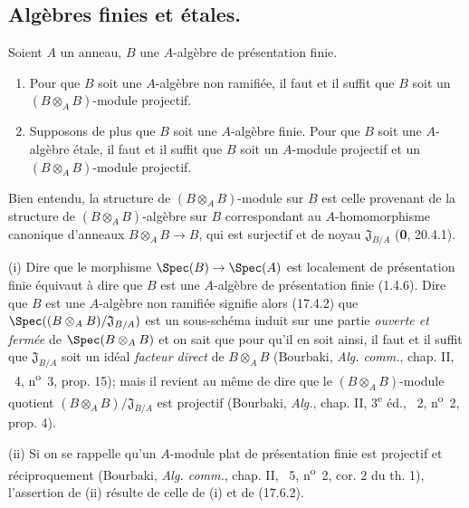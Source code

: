 \subsection{Algèbres finies et étales.}

\begin{proposition}[18.3.1]
\label{IV.18.3.1}
Soient $A$ un anneau, $B$ une $A$-algèbre de présentation finie.
\begin{enumerate}
  \item[\textup{(i)}] Pour que $B$ soit une $A$-algèbre non ramifiée, il faut et il suffit que $B$ soit un $(B\otimes_A B)$-module projectif.
  \item[\textup{(ii)}] Supposons de plus que $B$ soit une $A$-algèbre finie. Pour que $B$ soit une $A$-algèbre étale, il faut et il suffit que $B$ soit un $A$-module projectif et un $(B\otimes_A B)$-module projectif.
\end{enumerate}
\end{proposition}

Bien entendu, la structure de $(B\otimes_A B)$-module sur $B$ est celle provenant de la structure de $(B\otimes_A B)$-algèbre sur $B$ correspondant au $A$-homomorphisme canonique d'anneaux $B\otimes_A B\to B$, qui est surjectif et de noyau $\mathfrak J_{B/A}$ (\textbf{0}, 20.4.1).

(i) Dire que le morphisme $\Spec(B)\to\Spec(A)$ est localement de présentation finie équivaut à dire que $B$ est une $A$-algèbre de présentation finie (1.4.6). Dire
que $B$ est une $A$-algèbre non ramifiée signifie alors (17.4.2) que $\Spec((B\otimes_A B)/\mathfrak J_{B/A})$ est un sous-schéma induit sur une partie \emph{ouverte et fermée} de $\Spec(B\otimes_A B)$ et on sait que pour qu'il en soit ainsi, il faut et il suffit que $\mathfrak J_{B/A}$ soit un idéal \emph{facteur direct} de $B\otimes_A B$ (Bourbaki, \emph{Alg. comm.}, chap. II, \textsection~4, n\textsuperscript{o}~3, prop. 15); mais il revient au même de dire que le $(B\otimes_A B)$-module quotient $(B\otimes_A B)/\mathfrak J_{B/A}$ est projectif (Bourbaki, \emph{Alg.}, chap. II, 3\textsuperscript{e} éd., \textsection~2, n\textsuperscript{o}~2, prop. 4).

(ii) Si on se rappelle qu'un $A$-module plat de présentation finie est projectif et réciproquement (Bourbaki, \emph{Alg. comm.}, chap. II, \textsection~5, n\textsuperscript{o}~2, cor. 2 du th. 1), l'assertion de (ii) résulte de celle de (i) et de (17.6.2).

